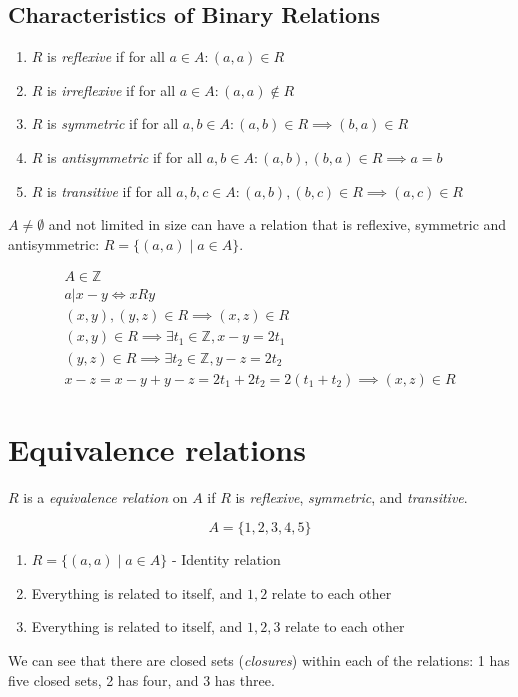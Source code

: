 \documentclass[00_complete]{subfiles}
\begin{document}
\subsection{Characteristics of Binary Relations}
\begin{enumerate}
    \item $R$ is \emph{reflexive} if for all $a \in A: (a,a) \in R$
    \item $R$ is \emph{irreflexive} if for all $a \in A: (a,a) \notin R$
    \item $R$ is \emph{symmetric} if for all $a,b \in A: (a,b) \in R \implies (b,a) \in R$
    \item $R$ is \emph{antisymmetric} if for all $a,b \in A: (a,b), (b,a) \in R \implies
   a=b$
    \item $R$ is \emph{transitive} if for all $a,b,c \in A: (a,b), (b,c) \in R \implies
   (a,c) \in R$
\end{enumerate}
$A \neq \emptyset$ and not limited in size can have a relation that is
reflexive, symmetric and antisymmetric: $R =\{(a,a) \mid a \in A \}$.
\begin{example}
$$
\begin{gathered}
    A \in \mathbb{Z} \\
    a|x-y \iff xRy \\
    (x,y), (y,z) \in R \implies (x,z) \in R \\
    (x,y) \in R \implies \exists t_1 \in \mathbb{Z}, x-y=2t_1 \\
    (y,z) \in R \implies \exists t_2 \in \mathbb{Z}, y-z=2t_2 \\
    x-z = x-y + y-z = 2t_1 + 2t_2 = 2(t_1 + t_2) \implies (x,z) \in R
\end{gathered}
$$
\end{example}
\section{Equivalence relations}
\begin{definition}
$R$ is a \emph{equivalence relation} on $A$ if $R$ is \emph{reflexive}, \emph{symmetric}, and
\emph{transitive}.
\end{definition}

\begin{example}
$$A = \{1,2,3,4,5\}$$
\begin{enumerate}
    \item $R = \{(a,a) \mid a \in A \}$ - Identity relation
    \item Everything is related to itself, and $1, 2$ relate to each other
    \item Everything is related to itself, and $1, 2, 3$ relate to each other
\end{enumerate}

We can see that there are closed sets (\emph{closures}) within each of the relations: 1 has
five closed sets, 2 has four, and 3 has three.
\end{example}
\end{document}
